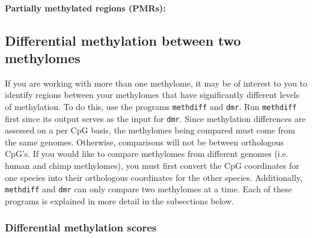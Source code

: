 \documentclass[10pt]{article}
\newcommand{\prog}[1]{\texttt{#1}}
\begin{document}
\paragraph{Partially methylated regions (PMRs):}





\subsection{Differential methylation between two methylomes}
\label{sec:differential_methylation}

If you are working with more than one methylome, it may be of interest
to you to identify regions between your methylomes that have
significantly different levels of methylation. To do this, use the
programs \prog{methdiff} and \prog{dmr}. Run \prog{methdiff}
first since its output serves as the input for \prog{dmr}. Since
methylation differences are assessed on a per CpG basis, the
methylomes being compared must come from the same genomes. Otherwise,
comparisons will not be between orthologous CpG's. If you would like
to compare methylomes from different genomes (i.e. human and chimp
methylomes), you must first convert the CpG coordinates for one
species into their orthologous coordinates for the other
species. Additionally, \prog{methdiff} and \prog{dmr} can only
compare two methylomes at a time. Each of these programs is explained
in more detail in the subsections below.

\subsubsection{Differential methylation scores}
\label{sec:methdiff}
\end{document}
